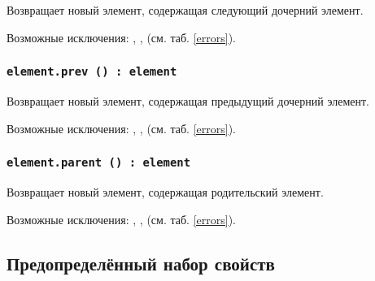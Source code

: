Возвращает новый элемент, содержащая следующий дочерний элемент.

Возможные исключения: , ,  (см. таб. \ref{errors}).

\subsubsection{\lstinline|element.prev () : element|}

Возвращает новый элемент, содержащая предыдущий дочерний элемент.

Возможные исключения: , ,  (см. таб. \ref{errors}).

\subsubsection{\lstinline|element.parent () : element|}

Возвращает новый элемент, содержащая родительский элемент.

Возможные исключения: , ,  (см. таб. \ref{errors}).

\subsection{Предопределённый набор свойств}
\label{elements:predefined:properties}

